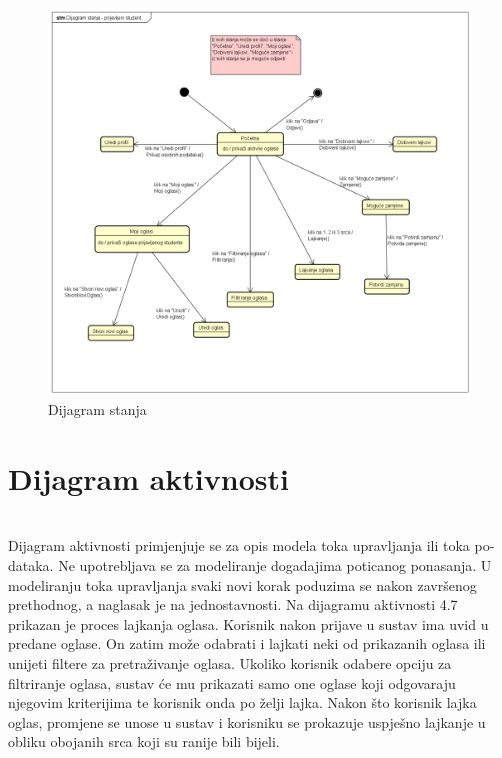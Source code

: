 			\begin{figure}[H]
				\includegraphics[scale=0.3]{slike/Dijagram_stanja_prijavljeni_student.PNG} %
				\centering
				\caption{Dijagram stanja}
				\label{fig:dijagramStanja}
			\end{figure}
			
			
			\eject 
			
			\section{Dijagram aktivnosti}
			
			\textbf{\textit{}}\\
			
			Dijagram aktivnosti primjenjuje se za opis modela toka upravljanja ili toka po-
dataka. Ne upotrebljava se za modeliranje dogadajima poticanog ponasanja. U 
modeliranju toka upravljanja svaki novi korak poduzima se nakon završenog prethodnog, a naglasak je na jednostavnosti. Na dijagramu aktivnosti 4.7 prikazan je
proces lajkanja oglasa. Korisnik nakon prijave u sustav ima uvid u predane oglase. On zatim može odabrati i lajkati neki od prikazanih oglasa ili unijeti filtere za pretraživanje oglasa. Ukoliko korisnik odabere opciju za filtriranje oglasa, sustav će mu prikazati samo one oglase koji odgovaraju njegovim kriterijima te korisnik onda po želji lajka. Nakon što korisnik lajka oglas, promjene se unose u sustav i korisniku se prokazuje uspješno lajkanje u obliku obojanih srca koji su ranije bili bijeli.
			
